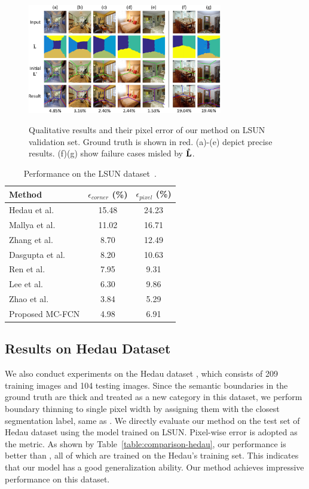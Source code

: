 \begin{figure}[!ht]
	\centering
	\textsc{\includegraphics[width=8.5cm]{figure/qualitive.png}}
	\caption{Qualitative results and their pixel error of our method on LSUN validation set. Ground truth is shown in red. (a)-(e) depict precise results. (f)(g) show failure cases misled by $\mathbf{\hat{L}}$. }
	\label{fig:qualitative}
\end{figure}

\begin{table}
	\centering 
	\begin{tabular}{lcc}
		\toprule
		Method & $\epsilon_{corner}$ (\%) & $\epsilon_{pixel}$ (\%) \\
		\midrule
		Hedau et al.~\cite{hedau2009recovering} & 15.48 & 24.23 \\
		Mallya et al.~\cite{mallya2015learning} & 11.02 & 16.71 \\
		Zhang et al.~\cite{zhang2017learning} & 8.70 & 12.49 \\
		Dasgupta et al.~\cite{dasgupta2016delay} & 8.20 & 10.63 \\
		Ren et al.~\cite{ren2016coarse} & 7.95 & 9.31 \\
		Lee et al.~\cite{LeeRoomNet17} & 6.30 & 9.86 \\
		Zhao et al.~\cite{zhao2017physics} & 3.84 & 5.29 \\
		\midrule
		Proposed MC-FCN & 4.98 & 6.91 \\
		\bottomrule
	\end{tabular}
	\caption{Performance on the LSUN dataset~\cite{zhang2015large}.}	
	\label{table:comparison-lsun}
\end{table}

\subsection{Results on Hedau Dataset}
\label{sec:Hedau}
We also conduct experiments on the Hedau dataset \cite{hedau2009recovering}, which consists of 209 training images and 104 testing images. 
Since the semantic boundaries in the ground truth are thick and treated as a new category in this dataset, we perform boundary thinning to single pixel width by assigning them with the closest segmentation label, same as \cite{LeeRoomNet17}. We directly evaluate our method on the test set of Hedau  dataset using the model trained on LSUN. 
Pixel-wise error is adopted as the metric. 
As shown by Table~\ref{table:comparison-hedau}, our performance is better than \cite{mallya2015learning,zhang2017learning,ren2016coarse}, all of which are trained on the Hedau's training set. This indicates that our model has a good generalization ability. 
Our method achieves impressive performance on this dataset.


